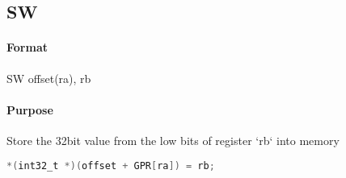 \subsection{SW}


\paragraph{Format} SW offset(ra), rb

\paragraph{Purpose} Store the 32bit value from the low bits of register `rb` into memory

\begin{lstlisting}[language=C]
    *(int32_t *)(offset + GPR[ra]) = rb;
\end{lstlisting}